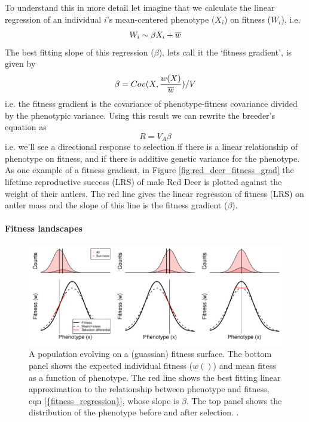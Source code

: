 To understand this in more detail let imagine that we calculate the
linear regression of an individual $i$'s mean-centered phenotype ($X_i$) on fitness ($W_i$), i.e. 
\begin{equation}
W_i \sim \beta X_i + \overline{w} \label{fitness_regression}
\end{equation}  
The best fitting slope of this regression ($\beta$), lets call it the
`fitness gradient', is given by
\begin{equation}
  \beta = Cov(X, \frac{w(X)}{\overline{w}} )/ V  \label{beta_covar}
  \end{equation}
 i.e. the fitness gradient is the covariance of phenotype-fitness
 covariance divided by the phenotypic variance. Using this result we can rewrite the breeder's equation as
\begin{equation}
R= V_A \beta
\end{equation}
i.e. we'll see a directional response to selection if there is a linear relationship of phenotype on fitness, and if there is additive genetic variance for the phenotype. As one example of a fitness gradient, in Figure \ref{fig:red_deer_fitness_grad}  the lifetime reproductive success (LRS) of male Red Deer is plotted against the weight of their antlers. The red line gives the linear regression of fitness (LRS) on antler mass and the slope of this line is the fitness gradient ($\beta$). 

\paragraph{Fitness landscapes}

  \begin{figure}
 \begin{center}
 \includegraphics[width= 0.8 \textwidth]{figures/Response_to_sel/fitness_landscape_1D_w_wbar.pdf}
 \end{center}
 \caption{A population evolving on a (guassian) fitness surface. The
   bottom panel shows the expected individual fitness ($w()$) and mean
   fitess as a function of phenotype. The red line shows the best
   fitting linear approximation to the relationship between phenotype
   and fitness, eqn \eqref{{fitness_regression}}, whose slope is
   $\beta$. The top panel shows the distribution of the phenotype
   before and after selection. .} \label{fig:fitness_landscape_1D_w_wbar}  
 \end{figure}

